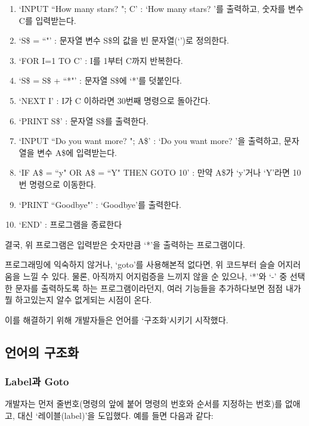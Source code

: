 \documentclass{article}
\begin{document}
\begin{enumerate}
    \item `INPUT ``How many stars? "; C' : `How many stars? '를 출력하고, 숫자를 변수 C를 입력받는다.
    \item `S\$ = ``"' : 문자열 변수 S\$의 값을 빈 문자열(`')로 정의한다.
    \item `FOR I=1 TO C' : I를 1부터 C까지 반복한다.
    \item `S\$ = S\$ + ``*"' : 문자열 S\$에 `*'를 덧붙인다.
    \item `NEXT I' : I가 C 이하라면 30번째 명령으로 돌아간다.
    \item `PRINT S\$' : 문자열 S\$를 출력한다.
    \item `INPUT ``Do you want more? "; A\$' : `Do you want more? '을 출력하고, 문자열을 변수 A\$에 입력받는다.
    \item `IF A\$ = ``y" OR A\$ = ``Y" THEN GOTO 10' : 만약 A\$가 `y'거나 `Y'라면 10번 명령으로 이동한다.
    \item `PRINT ``Goodbye"' : `Goodbye'를 출력한다.
    \item `END' : 프로그램을 종료한다
\end{enumerate}

결국, 위 프로그램은 입력받은 숫자만큼 `*'을 출력하는 프로그램이다.

프로그래밍에 익숙하지 않거나, `goto'를 사용해본적 없다면, 위 코드부터 슬슬 어지러움을 느낄 수 있다.
물론, 아직까지 어지럼증을 느끼지 않을 순 있으나, `*'와 `-' 중 선택한 문자를 출력하도록 하는 프로그램이라던지,
여러 기능들을 추가하다보면 점점 내가 뭘 하고있는지 알수 없게되는 시점이 온다.

이를 해결하기 위해 개발자들은 언어를 `구조화'시키기 시작했다.

\subsection{언어의 구조화}

\subsubsection{Label과 Goto}

개발자는 먼저 줄번호(명령의 앞에 붙어 명령의 번호와 순서를 지정하는 번호)를 없애고, 대신 `레이블(label)'을 도입했다.
예를 들면 다음과 같다:
\end{document}
